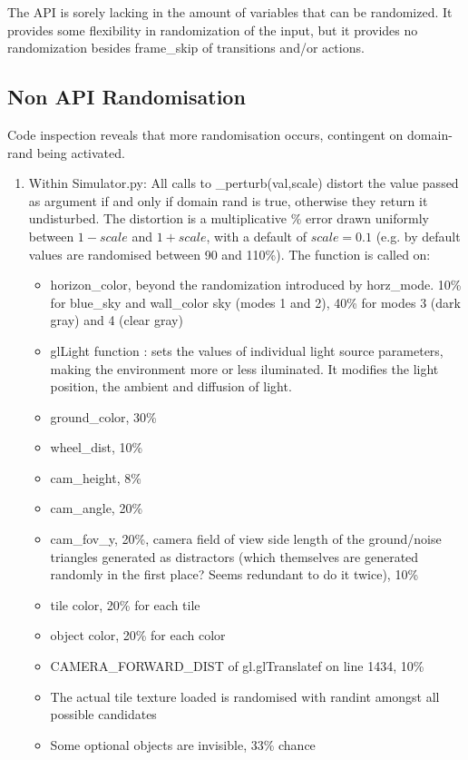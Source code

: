 The API is sorely lacking in the amount of variables that can be randomized. It provides some flexibility in randomization of the input, but it provides no randomization besides frame\_skip of transitions and/or actions.
\subsection{Non API Randomisation}
Code inspection reveals that more randomisation occurs, contingent on domain-rand being activated.
\begin{enumerate}
    \item Within Simulator.py: All calls to \_perturb(val,scale) distort the value passed as argument if and only if domain rand is true, otherwise they return it undisturbed. The distortion is a multiplicative \% error drawn uniformly between $1 - scale$ and $1 + scale$, with a default of $scale = 0.1$ (e.g. by default values are randomised between 90 and 110\%). The function is called on:
    \begin{itemize}
        \item horizon\_color, beyond the randomization introduced by horz\_mode. 10\% for blue\_sky and wall\_color sky (modes 1 and 2), 40\% for modes 3 (dark gray) and 4 (clear gray)
        \item glLight function : sets the values of individual light source parameters, making the environment more or less iluminated. It modifies the light position, the ambient and diffusion of light.
        \item ground\_color, 30\%
        \item wheel\_dist, 10\%
        \item cam\_height, 8\%
        \item cam\_angle, 20\%
        \item cam\_fov\_y, 20\%, camera field of view
        side length of the ground/noise triangles generated as distractors (which themselves are generated randomly in the first place? Seems redundant to do it twice), 10\%
        \item tile color, 20\% for each tile
        \item object color, 20\% for each color
        \item CAMERA\_FORWARD\_DIST of gl.glTranslatef on line 1434, 10\%
        \item The actual tile texture loaded is randomised with randint amongst all possible candidates
        \item Some optional objects are invisible, 33\% chance

\end{itemize}
\end{enumerate}
